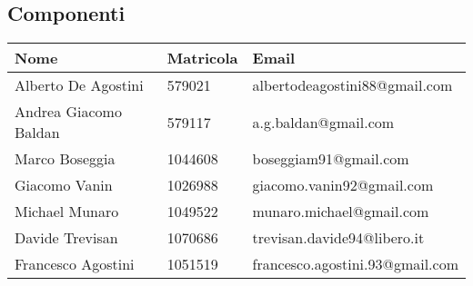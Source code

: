 \documentclass{scalatekids-article}
\begin{document}
\subsection{Componenti}
\begin{center}
  \begin{tabular}{|l | l | l |}
    \hline
    Nome & Matricola & Email \\
    \hline
    Alberto De Agostini & 579021 & albertodeagostini88@gmail.com\\
    Andrea Giacomo Baldan & 579117 & a.g.baldan@gmail.com\\
    Marco Boseggia & 1044608 & boseggiam91@gmail.com\\
    Giacomo Vanin & 1026988 & giacomo.vanin92@gmail.com\\
    Michael Munaro & 1049522 & munaro.michael@gmail.com\\
    Davide Trevisan & 1070686 & trevisan.davide94@libero.it\\
    Francesco Agostini & 1051519 & francesco.agostini.93@gmail.com\\
    \hline
  \end{tabular}
\end{center}
\newpage
\appendix
\listoftables
\listoffigures
\end{document}
